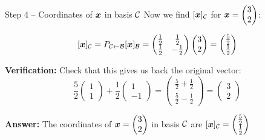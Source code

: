 \documentclass[aspectratio=169]{beamer}\usepackage[]{graphicx}\usepackage[]{xcolor}
\begin{document}
\begin{frame}{Step 4 -- Coordinates of $\bm{x}$ in basis $\mathcal{C}$}
Now we find $[\bm{x}]_{\mathcal{C}}$ for $\bm{x} = \begin{pmatrix} 3 \\ 2 \end{pmatrix}$:

$$[\bm{x}]_{\mathcal{C}} = P_{\mathcal{C}\leftarrow\mathcal{B}}[\bm{x}]_{\mathcal{B}} = \begin{pmatrix} \frac{1}{2} & \frac{1}{2} \\ \frac{1}{2} & -\frac{1}{2} \end{pmatrix}\begin{pmatrix} 3 \\ 2 \end{pmatrix} = \begin{pmatrix} \frac{5}{2} \\ \frac{1}{2} \end{pmatrix}$$

\vfill
\textbf{Verification:} Check that this gives us back the original vector:
$$\frac{5}{2}\begin{pmatrix} 1 \\ 1 \end{pmatrix} + \frac{1}{2}\begin{pmatrix} 1 \\ -1 \end{pmatrix} = \begin{pmatrix} \frac{5}{2} + \frac{1}{2} \\ \frac{5}{2} - \frac{1}{2} \end{pmatrix} = \begin{pmatrix} 3 \\ 2 \end{pmatrix}$$

\vfill
\textbf{Answer:} The coordinates of $\bm{x} = \begin{pmatrix} 3 \\ 2 \end{pmatrix}$ in basis $\mathcal{C}$ are $[\bm{x}]_{\mathcal{C}} = \begin{pmatrix} \frac{5}{2} \\ \frac{1}{2} \end{pmatrix}$
\end{frame}
\end{document}
